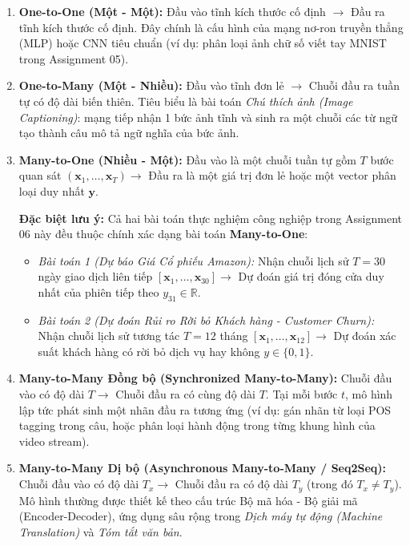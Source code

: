 \documentclass[12pt,a4paper]{report}
\begin{document}
\begin{enumerate}
    \item \textbf{One-to-One (Một - Một):} Đầu vào tĩnh kích thước cố định $\to$ Đầu ra tĩnh kích thước cố định. Đây chính là cấu hình của mạng nơ-ron truyền thẳng (MLP) hoặc CNN tiêu chuẩn (ví dụ: phân loại ảnh chữ số viết tay MNIST trong Assignment 05).
    \item \textbf{One-to-Many (Một - Nhiều):} Đầu vào tĩnh đơn lẻ $\to$ Chuỗi đầu ra tuần tự có độ dài biến thiên. Tiêu biểu là bài toán \textit{Chú thích ảnh (Image Captioning)}: mạng tiếp nhận 1 bức ảnh tĩnh và sinh ra một chuỗi các từ ngữ tạo thành câu mô tả ngữ nghĩa của bức ảnh.
    \item \textbf{Many-to-One (Nhiều - Một):} Đầu vào là một chuỗi tuần tự gồm $T$ bước quan sát $(\mathbf{x}_1, \dots, \mathbf{x}_T) \to$ Đầu ra là một giá trị đơn lẻ hoặc một vector phân loại duy nhất $\mathbf{y}$.
    
    \textbf{Đặc biệt lưu ý:} Cả hai bài toán thực nghiệm công nghiệp trong Assignment 06 này đều thuộc chính xác dạng bài toán \textbf{Many-to-One}:
    \begin{itemize}
        \item \textit{Bài toán 1 (Dự báo Giá Cổ phiếu Amazon):} Nhận chuỗi lịch sử $T = 30$ ngày giao dịch liên tiếp $[ \mathbf{x}_1, \dots, \mathbf{x}_{30} ] \to$ Dự đoán giá trị đóng cửa duy nhất của phiên tiếp theo $y_{31} \in \mathbb{R}$.
        \item \textit{Bài toán 2 (Dự đoán Rủi ro Rời bỏ Khách hàng - Customer Churn):} Nhận chuỗi lịch sử tương tác $T = 12$ tháng $[ \mathbf{x}_1, \dots, \mathbf{x}_{12} ] \to$ Dự đoán xác suất khách hàng có rời bỏ dịch vụ hay không $y \in \{0, 1\}$.
    \end{itemize}
    \item \textbf{Many-to-Many Đồng bộ (Synchronized Many-to-Many):} Chuỗi đầu vào có độ dài $T \to$ Chuỗi đầu ra có cùng độ dài $T$. Tại mỗi bước $t$, mô hình lập tức phát sinh một nhãn đầu ra tương ứng (ví dụ: gán nhãn từ loại POS tagging trong câu, hoặc phân loại hành động trong từng khung hình của video stream).
    \item \textbf{Many-to-Many Dị bộ (Asynchronous Many-to-Many / Seq2Seq):} Chuỗi đầu vào có độ dài $T_x \to$ Chuỗi đầu ra có độ dài $T_y$ (trong đó $T_x \neq T_y$). Mô hình thường được thiết kế theo cấu trúc Bộ mã hóa - Bộ giải mã (Encoder-Decoder), ứng dụng sâu rộng trong \textit{Dịch máy tự động (Machine Translation)} và \textit{Tóm tắt văn bản}.
\end{enumerate}
\end{document}
